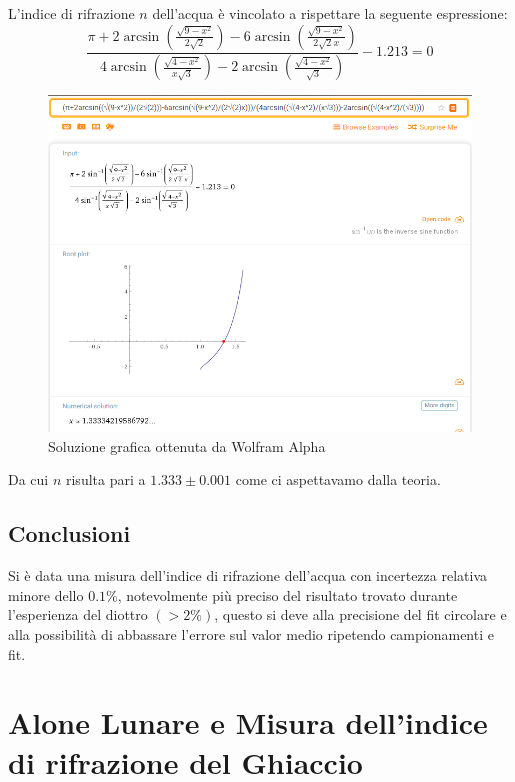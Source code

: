 \documentclass{report}[a4paper,11pt]
\begin{document}
L'indice di rifrazione $n$ dell'acqua è vincolato a rispettare la seguente espressione:
\begin{equation}\label{eq: radii}
\frac{\pi + 2\arcsin\left(\frac{\sqrt{9-x^2}}{2\sqrt{2}}\right) - 6\arcsin\left(\frac{\sqrt{9-x^2}}{2\sqrt{2}x}\right)}{4\arcsin\left(\frac{\sqrt{4-x^2}}{x\sqrt{3}}\right) - 2\arcsin\left(\frac{\sqrt{4-x^2}}{\sqrt{3}}\right)} -1.213 = 0
\end{equation}
\begin{figure}[H]
  \begin{center}
    \includegraphics[width=\textwidth]{./figs/wolfram.png}
  \end{center}
  \caption{Soluzione grafica ottenuta da Wolfram Alpha \cite{wolfram}}
\end{figure}
Da cui $n$ risulta pari a $1.333 \pm 0.001$ come ci aspettavamo dalla teoria.
\section{Conclusioni}
Si è data una misura dell'indice di rifrazione dell'acqua con incertezza relativa minore dello $0.1\%$, notevolmente più preciso del risultato trovato durante l'esperienza del diottro $(>2\%)$, questo si deve alla precisione del fit circolare e alla possibilità di abbassare l'errore sul valor medio ripetendo campionamenti e fit. 
\chapter{Alone Lunare e Misura dell'indice di rifrazione del Ghiaccio}
\end{document}
